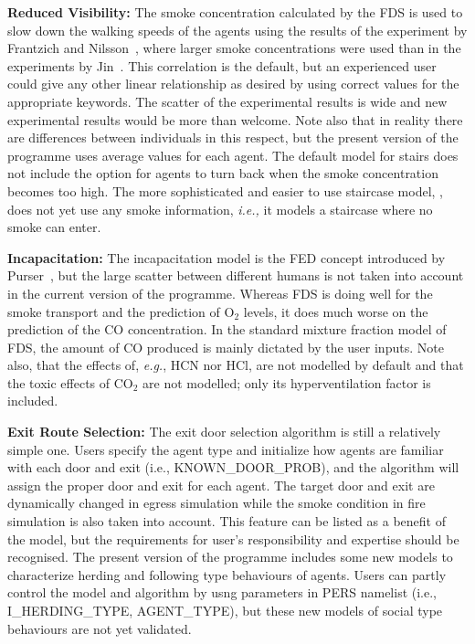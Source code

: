 \documentclass[12pt,a4paper,final,twoside]{stylevk}
\begin{document}
\textbf{Reduced Visibility:} The smoke concentration calculated by the
FDS is used to slow down the walking speeds of the agents using the
results of the experiment by Frantzich and Nilsson~\cite{Frantzich03},
where larger smoke concentrations were used than in the experiments by
Jin~\cite{Jin78}.  This correlation is the default, but an experienced
user could give any other linear relationship as desired by using
correct values for the appropriate keywords.  The scatter of the
experimental results is wide and new experimental results would be
more than welcome.  Note also that in reality there are differences
between individuals in this respect, but the present version of the
programme uses average values for each agent.  The default model for
stairs does not include the option for agents to turn back when the
smoke concentration becomes too high.  The more sophisticated and
easier to use staircase model, , does not yet use any
smoke information, \emph{i.e.,} it models a staircase where no smoke
can enter.


\textbf{Incapacitation:} The incapacitation model is the FED concept
introduced by Purser~\cite{Purser03}, but the large scatter between
different humans is not taken into account in the current version of
the programme.  Whereas FDS is doing well for the smoke transport and
the prediction of O${}_2$ levels, it does much worse on the prediction
of the CO concentration.  In the standard mixture fraction model of
FDS, the amount of CO produced is mainly dictated by the user inputs.
Note also, that the effects of, \emph{e.g.}, HCN nor HCl, are not
modelled by default and that the toxic effects of CO${}_2$ are not
modelled; only its hyperventilation factor is included.


\textbf{Exit Route Selection:} The exit door selection algorithm is
still a relatively simple one.  Users specify the agent type and
initialize how agents are familiar with each door and exit (i.e.,
KNOWN_DOOR_PROB), and the algorithm will assign the proper door and
exit for each agent.  The target door and exit are dynamically changed
in egress simulation while the smoke condition in fire simulation is also
taken into account.  This feature can be listed as a benefit of the model,
but the requirements for user's responsibility and expertise should be
recognised.  The present version of the programme includes some new models 
to characterize herding and following type behaviours of agents.  Users 
can partly control the model and algorithm by usng parameters in PERS namelist 
(i.e., I_HERDING_TYPE, AGENT_TYPE), but these new models of social type 
behaviours are not yet validated.
\end{document}
